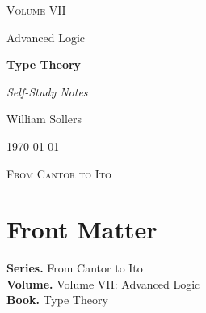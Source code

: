 \documentclass[12pt, a4paper]{report}
\begin{document}
\ExplSyntaxOff
\renewcommand{\familydefault}{\rmdefault}

\begin{titlepage}
\centering
\vspace*{3.5cm}

{\Large\scshape Volume VII\par}
\vspace{0.35cm}
{\large Advanced Logic\par}

\vspace{1.4cm}

{\Huge\bfseries Type Theory\par}

\vspace{0.6cm}
{\large\itshape Self-Study Notes\par}

\vfill

{\large William Sollers\par}
\vspace{0.35cm}
{\large \today\par}

\vfill

{\large\scshape From Cantor to Ito\par}
\end{titlepage}

\clearpage
\thispagestyle{plain}
\chapter*{Front Matter}
\noindent\textbf{Series.} From Cantor to Ito\\[0.5em]
\textbf{Volume.} Volume VII: Advanced Logic\\[0.5em]
\textbf{Book.} Type Theory

\clearpage
\tableofcontents
\clearpage
{}



\clearpage



\printindex[tech]
\printindex[dep]
\end{document}

